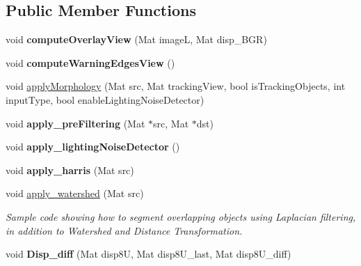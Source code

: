 \subsection*{Public Member Functions}
\begin{DoxyCompactItemize}
\item 
void {\bfseries compute\+Overlay\+View} (Mat imageL, Mat disp\+\_\+\+B\+GR)\hypertarget{class_stereo_morphology_adb2fff0719a4b62a1c6e5752738fb80a}{}\label{class_stereo_morphology_adb2fff0719a4b62a1c6e5752738fb80a}

\item 
void {\bfseries compute\+Warning\+Edges\+View} ()\hypertarget{class_stereo_morphology_a0f47dff428aa0c6bfed3fdd732c0cda1}{}\label{class_stereo_morphology_a0f47dff428aa0c6bfed3fdd732c0cda1}

\item 
void \hyperlink{class_stereo_morphology_a553677016aadec1ee2e88554c7cb4c22}{apply\+Morphology} (Mat src, Mat tracking\+View, bool is\+Tracking\+Objects, int input\+Type, bool enable\+Lighting\+Noise\+Detector)
\item 
void {\bfseries apply\+\_\+pre\+Filtering} (Mat $\ast$src, Mat $\ast$dst)\hypertarget{class_stereo_morphology_a00905737b3af09a4bda72eb349b66cd2}{}\label{class_stereo_morphology_a00905737b3af09a4bda72eb349b66cd2}

\item 
void {\bfseries apply\+\_\+lighting\+Noise\+Detector} ()\hypertarget{class_stereo_morphology_a5f54239981aa543ba03b53a68dcd6942}{}\label{class_stereo_morphology_a5f54239981aa543ba03b53a68dcd6942}

\item 
void {\bfseries apply\+\_\+harris} (Mat src)\hypertarget{class_stereo_morphology_a1429831d7e87f2a21b4af5ddba7e2d0b}{}\label{class_stereo_morphology_a1429831d7e87f2a21b4af5ddba7e2d0b}

\item 
void \hyperlink{class_stereo_morphology_a238d8a135ab855a9acfeb6486fb799af}{apply\+\_\+watershed} (Mat src)
\begin{DoxyCompactList}\small\item\em Sample code showing how to segment overlapping objects using Laplacian filtering, in addition to Watershed and Distance Transformation. \end{DoxyCompactList}\item 
void {\bfseries Disp\+\_\+diff} (Mat disp8U, Mat disp8\+U\+\_\+last, Mat disp8\+U\+\_\+diff)\hypertarget{class_stereo_morphology_a0e3379db4ff0dde2c0e70c76cd34c0b3}{}\label{class_stereo_morphology_a0e3379db4ff0dde2c0e70c76cd34c0b3}

\end{DoxyCompactItemize}
